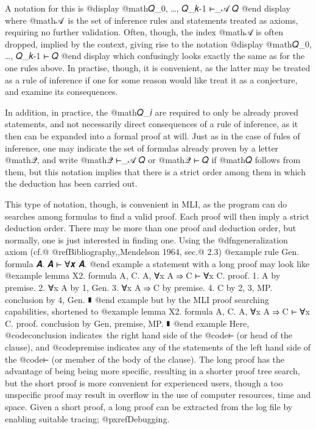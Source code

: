 A notation for this is
@display
@math{𝑄_0, …, 𝑄_{𝑘-1} ⊢_𝒜 𝑄}
@end display
where @math{𝒜} is the set of inference rules and statements treated as axioms, requiring no further validation. Often, though, the index @math{𝒜} is often dropped, implied by the context, giving rise to the notation
@display
@math{𝑄_0, …, 𝑄_{𝑘-1} ⊢ 𝑄}
@end display
which confusingly looks exactly the same as for the one rules above. In practise, though, it is convenient, as the latter may be treated as a rule of inference if one for some reason would like treat it as a conjecture, and examine its consequences.

In addition, in practice, the @math{𝑄_𝑖} are required to only be already proved statements, and not necessarily direct consequences of a rule of inference, as it then can be expanded into a formal proof at will. Just as in the case of fules of inference, one may indicate the set of formulas already proven by a letter @math{𝒬}, and write @math{𝒬 ⊢_𝒜 𝑄} or @math{𝒬 ⊢ 𝑄} if @math{𝑄} follows from them, but this notation implies that there is a strict order among them in which the deduction has been carried out.

This type of notation, though, is convenient in MLI, as the program can do searches among formulas to find a valid proof. Each proof will then imply a strict deduction order. There may be more than one proof and deduction order, but normally, one is just interested in finding one.
Using the @dfn{generalization axiom} (cf.@ @ref{Bibliography,,Mendelson 1964}, sec.@ 2.3)
@example
rule Gen. formula 𝑨. 𝑨 ⊢ ∀𝒙 𝑨.
@end example
a statement with a long proof may look like
@example
lemma X2. formula A, C.
  A, ∀x A ⇒ C ⊢ ∀x C.
proof.
  1. A by premise.
  2. ∀x A by 1, Gen.
  3. ∀x A ⇒ C by premise.
  4. C by 2, 3, MP.
  conclusion by 4, Gen.
∎
@end example
but by the MLI proof searching capabilities, shortened to
@example
lemma X2. formula A, C.
  A, ∀x A ⇒ C ⊢ ∀x C.
proof.
  conclusion by Gen, premise, MP.
∎
@end example
Here, @code{conclusion} indicates the right hand side of the @code{⊢} (or head of the clause), and @code{premise} indicates any of the statements of the left hand side of the @code{⊢} (or member of the body of the clause). The long proof has the advantage of being being more specific, resulting in a shorter proof tree search, but the short proof is more convenient for experienced users, though a too unspecific proof may result in overflow in the use of computer resources, time and space. Given a short proof, a long proof can be extracted from the log file by enabling suitable tracing; @pxref{Debugging}.


